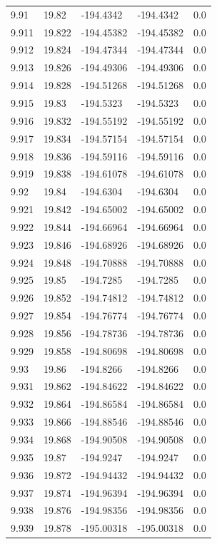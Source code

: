 \begin{tabular}{lllll}
9.91 & 19.82 & -194.4342 & -194.4342 & 0.0 \\
9.911 & 19.822 & -194.45382 & -194.45382 & 0.0 \\
9.912 & 19.824 & -194.47344 & -194.47344 & 0.0 \\
9.913 & 19.826 & -194.49306 & -194.49306 & 0.0 \\
9.914 & 19.828 & -194.51268 & -194.51268 & 0.0 \\
9.915 & 19.83 & -194.5323 & -194.5323 & 0.0 \\
9.916 & 19.832 & -194.55192 & -194.55192 & 0.0 \\
9.917 & 19.834 & -194.57154 & -194.57154 & 0.0 \\
9.918 & 19.836 & -194.59116 & -194.59116 & 0.0 \\
9.919 & 19.838 & -194.61078 & -194.61078 & 0.0 \\
9.92 & 19.84 & -194.6304 & -194.6304 & 0.0 \\
9.921 & 19.842 & -194.65002 & -194.65002 & 0.0 \\
9.922 & 19.844 & -194.66964 & -194.66964 & 0.0 \\
9.923 & 19.846 & -194.68926 & -194.68926 & 0.0 \\
9.924 & 19.848 & -194.70888 & -194.70888 & 0.0 \\
9.925 & 19.85 & -194.7285 & -194.7285 & 0.0 \\
9.926 & 19.852 & -194.74812 & -194.74812 & 0.0 \\
9.927 & 19.854 & -194.76774 & -194.76774 & 0.0 \\
9.928 & 19.856 & -194.78736 & -194.78736 & 0.0 \\
9.929 & 19.858 & -194.80698 & -194.80698 & 0.0 \\
9.93 & 19.86 & -194.8266 & -194.8266 & 0.0 \\
9.931 & 19.862 & -194.84622 & -194.84622 & 0.0 \\
9.932 & 19.864 & -194.86584 & -194.86584 & 0.0 \\
9.933 & 19.866 & -194.88546 & -194.88546 & 0.0 \\
9.934 & 19.868 & -194.90508 & -194.90508 & 0.0 \\
9.935 & 19.87 & -194.9247 & -194.9247 & 0.0 \\
9.936 & 19.872 & -194.94432 & -194.94432 & 0.0 \\
9.937 & 19.874 & -194.96394 & -194.96394 & 0.0 \\
9.938 & 19.876 & -194.98356 & -194.98356 & 0.0 \\
9.939 & 19.878 & -195.00318 & -195.00318 & 0.0 \\

\end{tabular}
